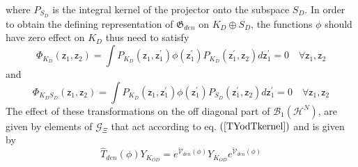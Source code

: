 \documentclass[aps,preprint]{revtex4}%
\begin{document}
where $P_{S_{D}}$ is the integral kernel of the projector onto the subspace
$S_{D}$. In order to obtain the defining representation of $\mathfrak{G}%
_{den}$ on $K_{D}\oplus S_{D}$, the functions $\phi$ should have zero effect
on $K_{D}$ thus need to satisfy
\begin{equation}
\Phi_{K_{D}}\left(  \mathsf{z}_{1},\mathsf{z}_{2}\right)  =\int P_{K_{D}%
}\left(  \mathsf{z}_{1},\mathsf{z}_{1}^{\prime}\right)  \phi\left(
\mathsf{z}_{1}^{\prime}\right)  P_{K_{D}}\left(  \mathsf{z}_{1}^{\prime
},\mathsf{z}_{2}\right)  d\mathsf{z}_{1}^{\prime}=0\quad\forall\mathsf{z}%
_{1},\mathsf{z}_{2} \label{projK}%
\end{equation}
and
\begin{equation}
\Phi_{K_{D}S_{D}}\left(  \mathsf{z}_{1},\mathsf{z}_{2}\right)  =\int P_{K_{D}%
}\left(  \mathsf{z}_{1},\mathsf{z}_{1}^{\prime}\right)  \phi\left(
\mathsf{z}_{1}^{\prime}\right)  P_{S_{D}}\left(  \mathsf{z}_{1}^{\prime
},\mathsf{z}_{2}\right)  d\mathsf{z}_{1}^{\prime}=0\quad\forall\mathsf{z}%
_{1},\mathsf{z}_{2} \label{projKS}%
\end{equation}
The effect of these transformations on the off diagonal part of $\mathcal{B}%
_{1}\left(  \mathcal{H}^{N}\right)  $, are given by elements of $\mathcal{G}%
_{\Xi}$ that act according to eq. $\left(  \ref{TYodTkernel}\right)  $ and is
given by
\begin{equation}
\hat{T}_{den}\left(  \phi\right)  Y_{K_{OD}}=e^{\mathcal{\breve{V}}%
_{den}\left(  \phi\right)  }Y_{K_{OD}}e^{\mathcal{\breve{V}}_{den}\left(
\phi\right)  }%
\end{equation}
\end{document}
